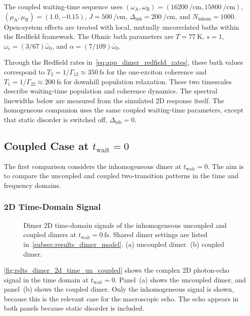 The coupled waiting-time sequence uses
\((\omega_{\mathrm{A}},\omega_{\mathrm{B}})=(\SI{16200}{\per\centi\metre},\SI{15800}{\per\centi\metre})\),
\((\mu_{\mathrm{A}},\mu_{\mathrm{B}})=(1.0,-0.15)\),
\(J=\SI{500}{\per\centi\metre}\),
\(\Delta_{\mathrm{inh}}=\SI{200}{\per\centi\metre}\), and
\(N_{\mathrm{inhom}}=1000\). Open-system effects are treated with local,
mutually uncorrelated baths within the Redfield framework. The Ohmic bath
parameters are \(T=\SI{77}{\kelvin}\), \(s=1\),
\(\omega_{\mathrm{c}}=(3/67)\bar{\omega}_0\), and
\(\alpha=(7/109)\bar{\omega}_0\). 

Through the Redfield rates
in~\autoref{eq:app_dimer_redfield_rates}, these bath values correspond to
\(T_{2}=1/\Gamma_{12}\approx\SI{350}{\femto\second}\) for the one-exciton
coherence and \(T_{1}=1/\Gamma_{22}\approx\SI{200}{\femto\second}\) for
downhill population relaxation. These two timescales describe waiting-time
population and coherence dynamics. The spectral linewidths below are measured
from the simulated 2D response itself. The
homogeneous companion uses the same
coupled waiting-time parameters, except that static disorder is switched off,
\(\Delta_{\mathrm{inh}}=0\).


\subsection{Coupled Case at \texorpdfstring{$t_{\mathrm{wait}}=0$}{t wait = 0}}
\label{subsec:results_dimer_coupled_case}

The first comparison considers the inhomogeneous dimer at $t_{\mathrm{wait}}=0$. The aim is to compare the uncoupled and coupled two-transition patterns in the time and frequency domains.

\subsubsection{2D Time-Domain Signal}

\begin{figure}[htbp]
    \centering
  \caption{Dimer 2D time-domain signals of the inhomogeneous uncoupled and
  coupled dimers at \(t_{\mathrm{wait}}=\SI{0}{\femto\second}\). Shared dimer
  settings are listed in~\autoref{subsec:results_dimer_model}. (a) uncoupled
  dimer. (b) coupled dimer.}
  \label{fig:rslts_dimer_2d_time_un_coupled}
\end{figure}

\autoref{fig:rslts_dimer_2d_time_un_coupled} shows the complex 2D photon-echo signal in the time domain at \(t_{\mathrm{wait}}=0\). Panel~(a) shows the uncoupled dimer, and panel~(b) shows the coupled dimer. Only the inhomogeneous signal is shown, because this is the relevant case for the macroscopic echo. The echo appears in both panels because static disorder is included.

